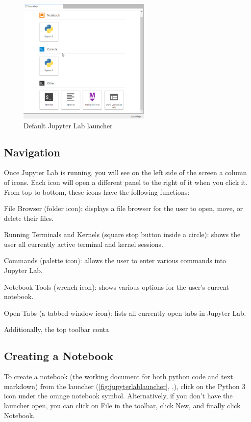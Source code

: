 \documentclass[pdftex,12pt]{artikel3}
\newcommand{\tabfigref}[1]{\autoref{#1}, \nameref{#1},}
\begin{document}
\begin{figure}[h!]
    \centering
    \includegraphics[width=65mm]{launcher.png}
    \caption{Default Jupyter Lab launcher}
    \label{fig:jupyterlablauncher}
\end{figure}

\subsection{Navigation}

Once Jupyter Lab is running, you will see on the left side of the screen a column of icons. Each icon will open a different panel to the right of it when you click it. From top to bottom, these icons have the following functions:

File Browser (folder icon): displays a file browser for the user to open, move, or delete their files.

Running Terminals and Kernels (square stop button inside a circle): shows the user all currently active terminal and kernel sessions.

Commands (palette icon): allows the user to enter various commands into Jupyter Lab.

Notebook Tools (wrench icon): shows various options for the user's current notebook.

Open Tabs (a tabbed window icon): lists all currently open tabs in Jupyter Lab.

Additionally, the top toolbar conta

\subsection{Creating a Notebook}

To create a notebook (the working document for both python code and text markdown) from the launcher (\tabfigref{fig:jupyterlablauncher}), click on the Python 3 icon under the orange notebook symbol. Alternatively, if you don't have the launcher open, you can click on File in the toolbar, click New, and finally click Notebook.
\end{document}
